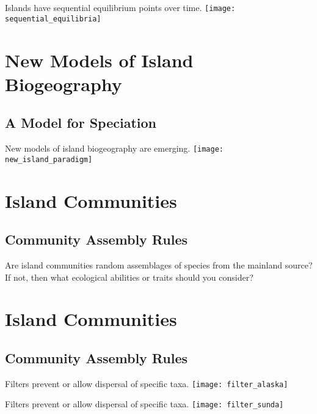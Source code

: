 \documentclass[xcolor=svgnames]{beamer}
\begin{document}
\begin{frame}{Islands have sequential equilibrium points over time.}
	\centering
		\texttt{[image: sequential\_equilibria]}
\end{frame}


\section{New Models of Island Biogeography}
\subsection{A Model for Speciation}

\begin{frame}{New models of island biogeography are emerging.}
	\centering
			\texttt{[image: new\_island\_paradigm]}
\end{frame}

\section{Island Communities}
\subsection{Community Assembly Rules}

{
\begin{frame}[b]{Are island communities random assemblages of species from the mainland source?}
\pause
If not, then what ecological abilities or traits should you consider?
\end{frame}
}

\section{Island Communities}
\subsection{Community Assembly Rules}

\begin{frame}{Filters prevent or allow dispersal of specific taxa.}
	\centering
		\texttt{[image: filter\_alaska]}\\
\end{frame}

\begin{frame}{Filters prevent or allow dispersal of specific taxa.}
	\centering
		\texttt{[image: filter\_sunda]}\\
\end{frame}
\end{document}
